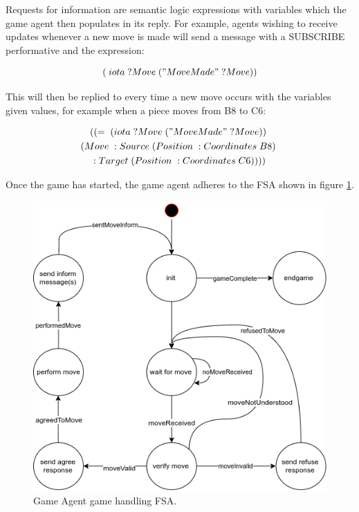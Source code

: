 \documentclass[conference]{IEEEtran}
\begin{document}
Requests for information are semantic logic expressions with variables which the game agent then populates in its reply. For example, agents wishing to receive updates whenever a new move is made will send a message with a SUBSCRIBE performative and the expression:

\begin{equation} \label{eq:movesubscribe}
	(\;iota\; ?Move\; ("Move Made"\; ?Move))	
\end{equation}

This will then be replied to every time a new move occurs with the variables given values, for example when a piece moves from B8 to C6:

\begin{multline} \label{eq:movesubscriberesponse}
	((=\; (iota\; ?Move\; ("Move Made"\; ?Move))\;  \\
	(Move\; :Source\; (Position\; :Coordinates\; B8)\; \\
	:Target\; (Position\; :Coordinates\; C6))))
\end{multline}

Once the game has started, the game agent adheres to the FSA shown in figure \ref{fig:gameagentfsa}. 

\begin{figure}[!h]
	\centering
	\includegraphics[width=\linewidth]{images/gameagentfsa}
	\caption{Game Agent game handling FSA.}
	\label{fig:gameagentfsa}
\end{figure}
\end{document}

